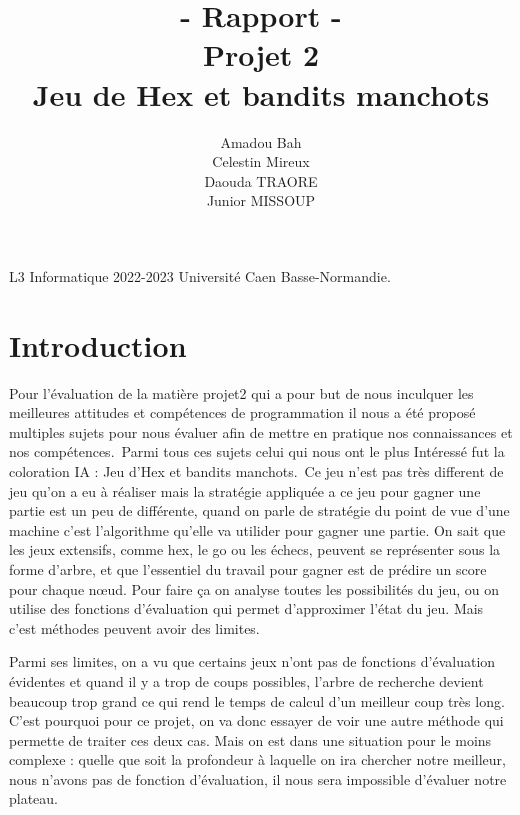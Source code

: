 \documentclass[12pt]{article}
\title{- Rapport  - \\Projet 2 \\ \textbf{Jeu de Hex et bandits manchots} }
\author{ Amadou Bah\\ Celestin Mireux \\Daouda TRAORE \\  Junior MISSOUP}
\date{}
\begin{document}
\maketitle
\mbox{}
\vfill
L3 Informatique 2022-2023 Université Caen Basse-Normandie.


\tableofcontents

\newpage
\section{Introduction}	
Pour l'évaluation de la matière projet2 qui a pour but de nous inculquer les meilleures attitudes et compétences de programmation il nous a été proposé multiples sujets pour nous évaluer afin de mettre en pratique nos connaissances et nos compétences. Parmi tous ces sujets celui qui nous ont le plus Intéressé fut la coloration IA : Jeu d'Hex et bandits manchots. Ce jeu n'est pas très different de jeu qu'on a eu à réaliser mais la stratégie appliquée a ce jeu pour gagner une partie est un peu de différente, quand on parle de stratégie du point de vue d'une machine c'est l'algorithme qu'elle va utilider pour gagner une partie. On sait que les jeux extensifs, comme hex, le go ou les échecs, peuvent se représenter sous la forme d'arbre, et que l'essentiel du travail pour gagner est de prédire un score pour chaque nœud. Pour faire ça on analyse toutes les possibilités du jeu, ou on utilise des fonctions d'évaluation qui permet d'approximer l'état du jeu. Mais c'est méthodes peuvent avoir des limites.

Parmi ses limites, on a vu que certains jeux n'ont pas de fonctions d'évaluation évidentes et quand il y a trop de coups possibles, l'arbre de recherche devient beaucoup trop grand ce qui rend le temps de calcul d'un meilleur coup très long.
C'est pourquoi pour ce projet, on va donc essayer de voir une autre méthode qui permette de traiter ces deux cas. 
Mais on est dans une situation pour le moins complexe : quelle que soit la profondeur à laquelle on ira chercher notre meilleur, nous n'avons pas de fonction d'évaluation, il nous sera impossible d'évaluer notre plateau.
\end{document}
